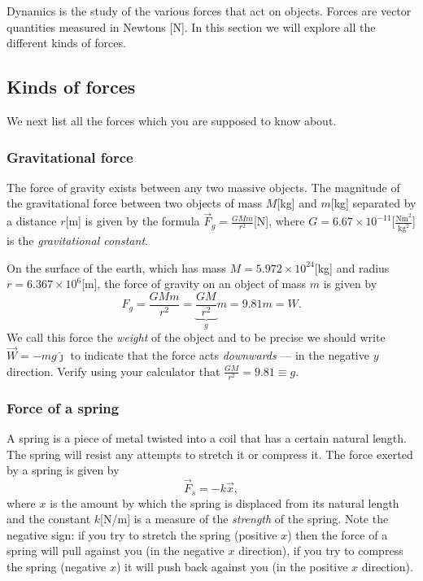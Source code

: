 \documentclass[letterpaper,9pt,journal]{IEEEtran}
\newcommand{\be}{\begin{equation}}
\newcommand{\ee}{\end{equation}}
\begin{document}
Dynamics is the study of the various forces that act on objects.
Forces are vector quantities measured in Newtons [N].
In this section we will explore all the different kinds of forces.

\vspace{-3mm}
\subsection{Kinds of forces}


We next list all the forces which you are supposed to know about.


\subsubsection{Gravitational force}
The force of gravity exists between any two massive objects.
The magnitude of the gravitational force between two objects of 
mass $M$[kg] and $m$[kg] separated by a distance $r$[m] is
given by the formula $\vec{F}_g=\frac{GMm}{r^2}$[N], where 
$G=6.67 \times 10^{-11}$[$\frac{\text{Nm}^2}{\text{kg}^2}$] is
the \emph{gravitational constant}.

On the surface of the earth, which has mass $M=5.972\times 10^{24}$[kg] 
and radius $r=6.367\times10^6$[m], the force of gravity on an object of 
mass $m$ is given by
\be
  F_g=\frac{GMm}{r^2} = \underbrace{\frac{GM}{r^2}}_{g}m = 9.81 m = W.
  \label{FORCE-G}
\ee
We call this force the \emph{weight} of the object and to be precise
we should write $\vec{W}=-mg\hat{\jmath}$ to indicate that the force acts
\emph{downwards} --- in the negative $y$ direction.
Verify using your calculator that $\frac{GM}{r^2}=9.81\equiv g$. 


\subsubsection{Force of a spring}
A spring is a piece of metal twisted into a coil that has a certain natural length.
The spring will resist any attempts to stretch it or compress it.
The force exerted by a spring is given by
\be
 \vec{F}_s=-k\vec{x},
  \label{FORCE-Spring}
\ee
where $x$ is the amount by which the spring is displaced from its natural length
and the constant $k$[N/m] is a measure of the  \emph{strength} of the spring.
Note the negative sign: if you try to stretch the spring (positive $x$) then the force
of a spring will pull against you (in the negative $x$ direction),
if you try to compress the spring (negative $x$) it will push back against you (in the positive $x$ direction).
\end{document}
